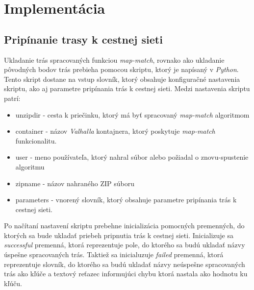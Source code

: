 \section{Implementácia}
\subsection{Pripínanie trasy k cestnej sieti}

Ukladanie trás spracovaných funkciou \textit{map-match}, rovnako ako ukladanie pôvodných bodov trás prebieha pomocou skriptu, ktorý je napísaný v \textit{Python}. Tento skript dostane na vstup slovník, ktorý obsahuje konfiguračné nastavenia skriptu, ako aj parametre pripínania trás k cestnej sieti. Medzi nastavenia skriptu patrí:
\begin{itemize}
    \item unzipdir - cesta k priečinku, ktorý má byť spracovaný \textit{map-match} algoritmom
    \item container - názov \textit{Valhalla} kontajnera, ktorý poskytuje \textit{map-match} funkcionalitu.
    \item user - meno používateľa, ktorý nahral súbor alebo požiadal o znovu-spustenie algoritmu
    \item zipname - názov nahraného ZIP súboru
    \item parameters - vnorený slovník, ktorý obsahuje parametre pripínania trás k cestnej sieti.
\end{itemize}

Po načítaní nastavení skriptu prebehne inicializácia pomocných premenných, do ktorých sa bude ukladať priebeh pripnutia trás k cestnej sieti. Inicializuje sa \textit{successful} premenná, ktorá reprezentuje pole, do ktorého sa budú ukladať názvy úspešne spracovaných trás. Taktiež sa inicialuzuje \textit{failed} premenná, ktorá reprezentuje slovník, do ktorého sa budú ukladať názvy neúspešne spracovaných trás ako kľúče a textový reťazec informujúci chybu ktorá nastala ako hodnotu ku kľúču.

